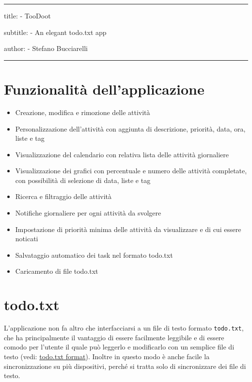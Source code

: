 \documentclass[]{article}
\date{}
\providecommand{\tightlist}{%
  \setlength{\itemsep}{0pt}\setlength{\parskip}{0pt}}
\begin{document}
\begin{center}\rule{0.5\linewidth}{\linethickness}\end{center}

title: - TooDoot

subtitle: - An elegant todo.txt app

author: - Stefano Bucciarelli

\begin{center}\rule{0.5\linewidth}{\linethickness}\end{center}

\hypertarget{funzionalitaux300-dellapplicazione}{%
\section{Funzionalità
dell'applicazione}\label{funzionalitaux300-dellapplicazione}}

\begin{itemize}
\tightlist
\item
  Creazione, modifica e rimozione delle attività
\item
  Personalizzazione dell'attività con aggiunta di descrizione, priorità,
  data, ora, liste e tag
\item
  Visualizzazione del calendario con relativa lista delle attività
  giornaliere
\item
  Visualizzazione dei grafici con percentuale e numero delle attività
  completate, con possibilità di selezione di data, liste e tag
\item
  Ricerca e filtraggio delle attività
\item
  Notifiche giornaliere per ogni attività da svolgere
\item
  Impostazione di priorità minima delle attività da visualizzare e di
  cui essere noticati
\item
  Salvataggio automatico dei task nel formato todo.txt
\item
  Caricamento di file todo.txt
\end{itemize}

\hypertarget{todo.txt}{%
\section{todo.txt}\label{todo.txt}}

L'applicazione non fa altro che interfacciarsi a un file di testo
formato \texttt{todo.txt}, che ha principalmente il vantaggio di essere
facilmente leggibile e di essere comodo per l'utente il quale può
leggerlo e modificarlo con un semplice file di testo (vedi:
\href{https://github.com/todotxt/todo.txt}{todo.txt format}). Inoltre in
questo modo è anche facile la sincronizzazione su più dispositivi,
perché si tratta solo di sincronizzare dei file di testo.
\end{document}
